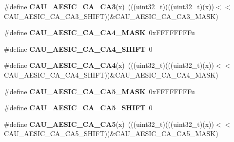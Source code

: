 \begin{DoxyCompactItemize}
\item 
\#define {\bfseries C\+A\+U\+\_\+\+A\+E\+S\+I\+C\+\_\+\+C\+A\+\_\+\+C\+A3}(x)~(((uint32\+\_\+t)(((uint32\+\_\+t)(x))$<$$<$C\+A\+U\+\_\+\+A\+E\+S\+I\+C\+\_\+\+C\+A\+\_\+\+C\+A3\+\_\+\+S\+H\+I\+FT))\&C\+A\+U\+\_\+\+A\+E\+S\+I\+C\+\_\+\+C\+A\+\_\+\+C\+A3\+\_\+\+M\+A\+SK)\hypertarget{group__CAU__Register__Masks_ga5113854b12720683b6e771319b35ce8c}{}\label{group__CAU__Register__Masks_ga5113854b12720683b6e771319b35ce8c}

\item 
\#define {\bfseries C\+A\+U\+\_\+\+A\+E\+S\+I\+C\+\_\+\+C\+A\+\_\+\+C\+A4\+\_\+\+M\+A\+SK}~0x\+F\+F\+F\+F\+F\+F\+F\+Fu\hypertarget{group__CAU__Register__Masks_ga5f7f6b876abee0856218de45b4d3323e}{}\label{group__CAU__Register__Masks_ga5f7f6b876abee0856218de45b4d3323e}

\item 
\#define {\bfseries C\+A\+U\+\_\+\+A\+E\+S\+I\+C\+\_\+\+C\+A\+\_\+\+C\+A4\+\_\+\+S\+H\+I\+FT}~0\hypertarget{group__CAU__Register__Masks_gabd609af8c8366c17977c9afb71ad3ca5}{}\label{group__CAU__Register__Masks_gabd609af8c8366c17977c9afb71ad3ca5}

\item 
\#define {\bfseries C\+A\+U\+\_\+\+A\+E\+S\+I\+C\+\_\+\+C\+A\+\_\+\+C\+A4}(x)~(((uint32\+\_\+t)(((uint32\+\_\+t)(x))$<$$<$C\+A\+U\+\_\+\+A\+E\+S\+I\+C\+\_\+\+C\+A\+\_\+\+C\+A4\+\_\+\+S\+H\+I\+FT))\&C\+A\+U\+\_\+\+A\+E\+S\+I\+C\+\_\+\+C\+A\+\_\+\+C\+A4\+\_\+\+M\+A\+SK)\hypertarget{group__CAU__Register__Masks_ga79b687603e9671199241f6488b42c3f5}{}\label{group__CAU__Register__Masks_ga79b687603e9671199241f6488b42c3f5}

\item 
\#define {\bfseries C\+A\+U\+\_\+\+A\+E\+S\+I\+C\+\_\+\+C\+A\+\_\+\+C\+A5\+\_\+\+M\+A\+SK}~0x\+F\+F\+F\+F\+F\+F\+F\+Fu\hypertarget{group__CAU__Register__Masks_ga28294b997bba57c20628810c8a6a2b62}{}\label{group__CAU__Register__Masks_ga28294b997bba57c20628810c8a6a2b62}

\item 
\#define {\bfseries C\+A\+U\+\_\+\+A\+E\+S\+I\+C\+\_\+\+C\+A\+\_\+\+C\+A5\+\_\+\+S\+H\+I\+FT}~0\hypertarget{group__CAU__Register__Masks_gaf4c9726f6f0de1a13fa2b5a24034827b}{}\label{group__CAU__Register__Masks_gaf4c9726f6f0de1a13fa2b5a24034827b}

\item 
\#define {\bfseries C\+A\+U\+\_\+\+A\+E\+S\+I\+C\+\_\+\+C\+A\+\_\+\+C\+A5}(x)~(((uint32\+\_\+t)(((uint32\+\_\+t)(x))$<$$<$C\+A\+U\+\_\+\+A\+E\+S\+I\+C\+\_\+\+C\+A\+\_\+\+C\+A5\+\_\+\+S\+H\+I\+FT))\&C\+A\+U\+\_\+\+A\+E\+S\+I\+C\+\_\+\+C\+A\+\_\+\+C\+A5\+\_\+\+M\+A\+SK)\hypertarget{group__CAU__Register__Masks_gadcf8798d25e40ad79a768ef17e61a6c7}{}\label{group__CAU__Register__Masks_gadcf8798d25e40ad79a768ef17e61a6c7}


\end{DoxyCompactItemize}
